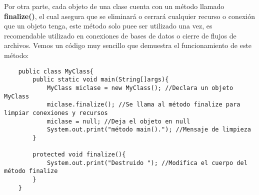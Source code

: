 Por otra parte, cada objeto de una clase cuenta con un método llamado \textbf{finalize()}, el cual asegura que se eliminará o cerrará cualquier recurso o conexión que un objeto tenga, este método solo puee ser utilizado una vez, es recomendable utilizado en conexiones de bases de datos o cierre de flujos de archivos.
Vemos un código muy sencillo que demuestra el funcionamiento de este método:
\begin{lstlisting}
    public class MyClass{
        public static void main(String[]args){
            MyClass miclase = new MyClass(); //Declara un objeto MyClass
            miclase.finalize(); //Se llama al método finalize para limpiar conexiones y recursos
            miclase = null; //Deja el objeto en null
            System.out.print("método main()."); //Mensaje de limpieza
        }
        
       	protected void finalize(){
       		System.out.print("Destruido "); //Modifica el cuerpo del método finalize
       	}
    }
\end{lstlisting}

